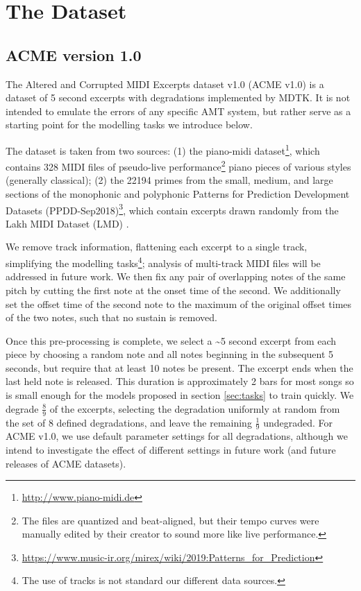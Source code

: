 \documentclass{article}
\begin{document}
\section{The Dataset}
\label{sec:acme}
\subsection{ACME version 1.0}

The Altered and Corrupted MIDI Excerpts dataset v1.0 (ACME v1.0) is a dataset of 5 second excerpts with degradations implemented by MDTK. It is not intended to emulate the errors of any specific AMT system, but rather serve as a starting point for the modelling tasks we introduce below.

The dataset is taken from two sources: (1) the piano-midi dataset\footnote{\url{http://www.piano-midi.de}}, which contains 328 MIDI files of pseudo-live performance\footnote{The files are quantized and beat-aligned, but their tempo curves were manually edited by their creator to sound more like live performance.} piano pieces of various styles (generally classical); (2) the 22194 primes from the small, medium, and large sections of the monophonic and polyphonic Patterns for Prediction Development Datasets (PPDD-Sep2018)\footnote{\url{https://www.music-ir.org/mirex/wiki/2019:Patterns_for_Prediction}}, which contain excerpts drawn randomly from the Lakh MIDI Dataset (LMD) \cite{raffel2016learning}.

We remove track information, flattening each excerpt to a single track, simplifying the modelling tasks\footnote{The use of tracks is not standard our different data sources.}; analysis of multi-track MIDI files will be addressed in future work. We then fix any pair of overlapping notes of the same pitch by cutting the first note at the onset time of the second. We additionally set the offset time of the second note to the maximum of the original offset times of the two notes, such that no sustain is removed.

Once this pre-processing is complete, we select a \textasciitilde 5 second excerpt from each piece by choosing a random note and all notes beginning in the subsequent 5 seconds, but require that at least 10 notes be present. The excerpt ends when the last held note is released. This duration is approximately 2 bars for most songs so is small enough for the models proposed in section \ref{sec:tasks} to train quickly. We degrade $\frac{8}{9}$ of the excerpts, selecting the degradation uniformly at random from the set of 8 defined degradations, and leave the remaining $\frac{1}{9}$ undegraded. For ACME v1.0, we use default parameter settings for all degradations, although we intend to investigate the effect of different settings in future work (and future releases of ACME datasets).
\end{document}

